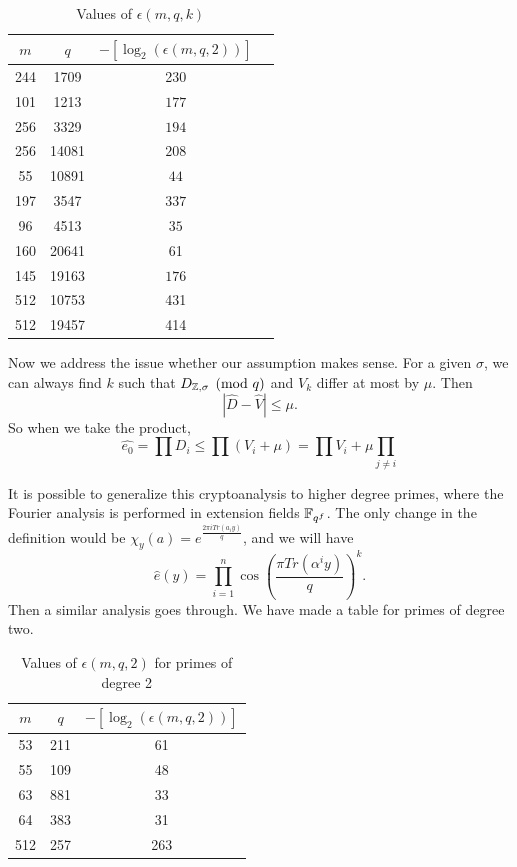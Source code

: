 \documentclass{amsart}
\begin{document}
\FloatBarrier
\begin{table}[H]
\caption{Values of $\epsilon(m,q,k)$}
\begin{tabular}{c|c|c|c}
$m$ & $q$ & $-[\log_2(\epsilon(m,q, 2))]$ \\
\hline
244 & 1709 & 230 \\
101 & 1213 & $177$ \\
256 & 3329 & $194$ \\
256 & 14081 & $208$ \\
55 & 10891  & $44$ \\
197 & 3547 & $337$ \\
96 & 4513 & $35$ \\
160 & 20641 & 61 \\
145 & 19163 & $176$ \\
512 & 10753 & 431 \\
512 & 19457 & 414
\end{tabular}
\end{table}


Now we address the issue whether our assumption makes sense.
For a given $\sigma$, we can always find $k$ such that $D_{\mathbb{Z}, \sigma} \pmod{q}$ and $V_k$ differ at most by $\mu$. Then
\[
    |\hat{D} - \hat{V}| \leq \mu.
\]
So when we take the product,
\[
    \hat{e_0}  = \prod D_i  \leq \prod (V_i + \mu) = \prod V_i + \mu \prod_{j \neq i}
\]


\begin{remark}
It is possible to generalize this cryptoanalysis to higher degree primes, where the Fourier analysis is performed in extension fields $\mathbb{F}_{q^f}$. The only change in the definition would be $\chi_y(a) = e^{ \frac{2 \pi i Tr(a_i y)}{q}}$, and we will have
\[
    \widehat{e}(y) = \prod_{i=1}^{n} \cos \left(\frac{ \pi Tr(\alpha^i y) }{q} \right)^k.
\]
Then a similar analysis goes through. We have made a table for primes of degree two.
\end{remark}

\FloatBarrier
\begin{table}[H]
\caption{Values of $\epsilon(m,q,2)$ for primes of degree 2}
\begin{tabular}{c|c|c}
$m$ & $q$ & $-[\log_2(\epsilon(m,q,2))]$ \\
\hline
53 & 211 & 61 \\
55 & 109 & 48 \\
63 & 881 & 33 \\
64 & 383 & 31 \\
512 & 257 & 263
\end{tabular}
\end{table}
\end{document}
